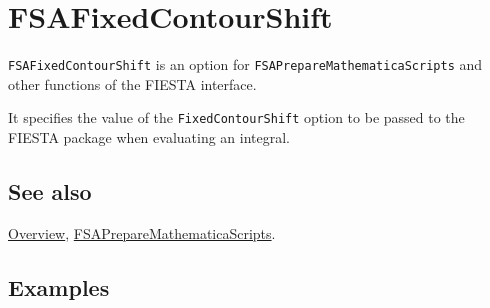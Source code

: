 \documentclass[../FeynHelpersManual.tex]{subfiles}
\begin{document}
\begin{Shaded}
\begin{Highlighting}[]
 
\end{Highlighting}
\end{Shaded}

\hypertarget{fsafixedcontourshift}{
\section{FSAFixedContourShift}\label{fsafixedcontourshift}}

\texttt{FSAFixedContourShift} is an option for
\texttt{FSAPrepareMathematicaScripts} and other functions of the FIESTA
interface.

It specifies the value of the \texttt{FixedContourShift} option to be
passed to the FIESTA package when evaluating an integral.

\subsection{See also}

\hyperlink{toc}{Overview},
\hyperlink{fsapreparemathematicascripts}{FSAPrepareMathematicaScripts}.

\subsection{Examples}
\end{document}
